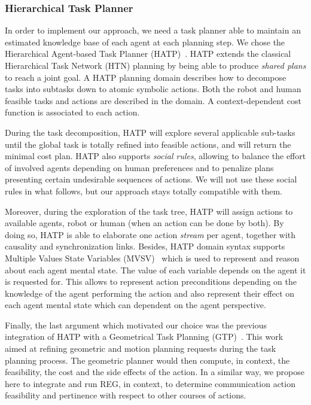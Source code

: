 \documentclass[a4paper,11pt,twoside]{StyleThese}
\begin{document}
\subsubsection{Hierarchical Task Planner}

In order to implement our approach, we need a task planner able to maintain an estimated knowledge base of each agent at each planning step. We chose the Hierarchical Agent-based Task Planner (HATP)~\cite{lallement2014hatp}. HATP extends the classical Hierarchical Task Network (HTN) planning by being able to produce \textit{shared plans} to reach a joint goal. A HATP planning domain describes how to decompose tasks into subtasks down to atomic symbolic actions. Both the robot and human feasible tasks and actions are described in the domain. A context-dependent cost function is associated to each action. 

During the task decomposition, HATP will explore several applicable sub-tasks until the global task is totally refined into feasible actions, and will return the minimal cost plan. HATP also supports \textit{social rules}, allowing to balance the effort of involved agents depending on human preferences and to penalize plans presenting certain undesirable sequences of actions. We will not use these social rules in what follows, but our approach stays totally compatible with them.

Moreover, during the exploration of the task tree, HATP will assign actions to available agents, robot or human (when an action can be done by both). By doing so, HATP is able to elaborate one action \textit{stream} per agent, together with causality and synchronization links. 
Besides, HATP domain syntax supports Multiple Values State Variables (MVSV)~\cite{guitton2012belief} which is used to represent and reason about each agent mental state. The value of each variable depends on the agent it is requested for. This allows to represent action preconditions depending on the knowledge of the agent performing the action and also represent their effect on each agent mental state which can dependent on the agent perspective.

Finally, the last argument which motivated our choice was the previous integration of HATP  with a  Geometrical Task Planning (GTP)~\cite{gharbi2015combining}. This work aimed at refining geometric and motion planning requests during the task planning process. The geometric planner would then compute, in context, the feasibility, the cost and the side effects of the action. In a similar way, we propose here to integrate and run REG, in context, to determine communication action feasibility and pertinence with respect to other courses of actions.
\end{document}
